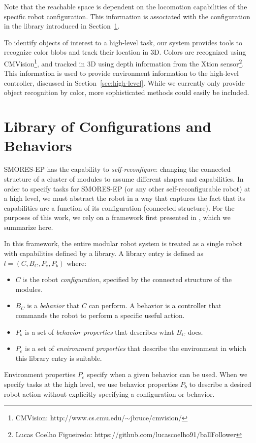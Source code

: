 \documentclass[conference]{IEEEtran}
\begin{document}
Note that the reachable space is dependent on the locomotion capabilities of the specific robot configuration. This information is associated with the configuration in the library introduced in Section~\ref{sec:configuration-specifics}.

To identify objects of interest to a high-level task, our system provides tools to recognize color blobs and track their location in 3D.  Colors are recognized using CMVision\footnote{CMVision: http://www.cs.cmu.edu/$\sim$jbruce/cmvision/}, and tracked in 3D using depth information from the Xtion sensor\footnote{Lucas Coelho Figueiredo: https://github.com/lucascoelho91/ballFollower}. This information is used to provide environment information to the high-level controller, discussed in Section~\ref{sec:high-level}.  While we currently only provide object recognition by color, more sophisticated methods could easily be included. 
%

\section{Library of Configurations and Behaviors}
\label{sec:configuration-specifics}
%
SMORES-EP has the capability to \emph{self-reconfigure}: changing the connected structure of a cluster of modules to assume different shapes and capabilities.  In order to specify tasks for SMORES-EP (or any other self-reconfigurable robot) at a high level, we must abstract the robot in a way that captures the fact that its capabilities are a function of its configuration (connected structure). For the purposes of this work, we rely on a framework first presented in \cite{Jing2016}, which we summarize here.

In this framework, the entire modular robot system is treated as a single robot with capabilities defined by a library. A library entry is defined as $l = (C,B_C,P_e,P_b)$ where:
\begin{itemize}
\item $C$ is the robot \emph{configuration}, specified by the connected structure of the modules.
\item $B_C$ is a \emph{behavior} that $C$ can perform. A behavior is a controller that commands the robot to perform a specific useful action. 
\item $P_b$ is a set of \emph{behavior properties} that describes what $B_C$ does. 
\item $P_e$ is a set of \emph{environment properties} that describe the environment in which this library entry is suitable. 
\end{itemize} 
%
Environment properties $P_e$ specify when a given behavior can be used. When we specify tasks at the high level, we use behavior properties $P_b$ to describe a desired robot action without explicitly specifying a configuration or behavior.
\end{document}
